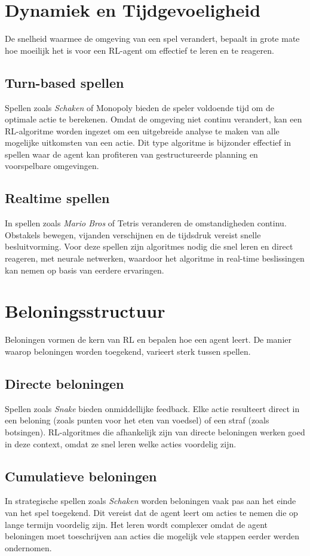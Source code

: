 \documentclass[a4paper,12pt]{report}
\begin{document}
\section{Dynamiek en Tijdgevoeligheid}
De snelheid waarmee de omgeving van een spel verandert, bepaalt in grote mate
hoe moeilijk het is voor een RL-agent om effectief te leren en te reageren.

\subsection{Turn-based spellen}
Spellen zoals \textit{Schaken} of Monopoly bieden de speler voldoende tijd om
de optimale actie te berekenen. Omdat de omgeving niet continu verandert, kan
een RL-algoritme worden ingezet om een uitgebreide analyse te maken van alle
mogelijke uitkomsten van een actie. Dit type algoritme is bijzonder effectief
in spellen waar de agent kan profiteren van gestructureerde planning en
voorspelbare omgevingen.

\subsection{Realtime spellen}
In spellen zoals \textit{Mario Bros} of Tetris veranderen de omstandigheden
continu. Obstakels bewegen, vijanden verschijnen en de tijdsdruk vereist snelle
besluitvorming. Voor deze spellen zijn algoritmes nodig die snel leren en
direct reageren, met neurale netwerken, waardoor het algoritme in real-time
beslissingen kan nemen op basis van eerdere ervaringen.

\section{Beloningsstructuur}
Beloningen vormen de kern van RL en bepalen hoe een agent leert. De manier
waarop beloningen worden toegekend, varieert sterk tussen spellen.

\subsection{Directe beloningen}
Spellen zoals \textit{Snake} bieden onmiddellijke feedback. Elke actie
resulteert direct in een beloning (zoals punten voor het eten van voedsel) of
een straf (zoals botsingen). RL-algoritmes die afhankelijk zijn van directe
beloningen werken goed in deze context, omdat ze snel leren welke acties
voordelig zijn.

\subsection{Cumulatieve beloningen}
In strategische spellen zoals \textit{Schaken} worden beloningen vaak pas aan
het einde van het spel toegekend. Dit vereist dat de agent leert om acties te
nemen die op lange termijn voordelig zijn. Het leren wordt complexer omdat de
agent beloningen moet toeschrijven aan acties die mogelijk vele stappen eerder
werden ondernomen.
\end{document}
